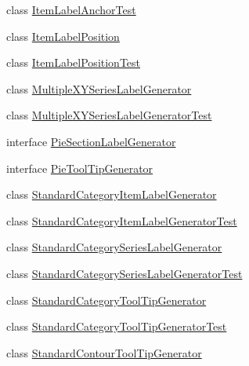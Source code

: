 \begin{DoxyCompactItemize}
class \mbox{\hyperlink{classorg_1_1jfree_1_1chart_1_1labels_1_1_item_label_anchor_test}{Item\+Label\+Anchor\+Test}}
\item 
class \mbox{\hyperlink{classorg_1_1jfree_1_1chart_1_1labels_1_1_item_label_position}{Item\+Label\+Position}}
\item 
class \mbox{\hyperlink{classorg_1_1jfree_1_1chart_1_1labels_1_1_item_label_position_test}{Item\+Label\+Position\+Test}}
\item 
class \mbox{\hyperlink{classorg_1_1jfree_1_1chart_1_1labels_1_1_multiple_x_y_series_label_generator}{Multiple\+X\+Y\+Series\+Label\+Generator}}
\item 
class \mbox{\hyperlink{classorg_1_1jfree_1_1chart_1_1labels_1_1_multiple_x_y_series_label_generator_test}{Multiple\+X\+Y\+Series\+Label\+Generator\+Test}}
\item 
interface \mbox{\hyperlink{interfaceorg_1_1jfree_1_1chart_1_1labels_1_1_pie_section_label_generator}{Pie\+Section\+Label\+Generator}}
\item 
interface \mbox{\hyperlink{interfaceorg_1_1jfree_1_1chart_1_1labels_1_1_pie_tool_tip_generator}{Pie\+Tool\+Tip\+Generator}}
\item 
class \mbox{\hyperlink{classorg_1_1jfree_1_1chart_1_1labels_1_1_standard_category_item_label_generator}{Standard\+Category\+Item\+Label\+Generator}}
\item 
class \mbox{\hyperlink{classorg_1_1jfree_1_1chart_1_1labels_1_1_standard_category_item_label_generator_test}{Standard\+Category\+Item\+Label\+Generator\+Test}}
\item 
class \mbox{\hyperlink{classorg_1_1jfree_1_1chart_1_1labels_1_1_standard_category_series_label_generator}{Standard\+Category\+Series\+Label\+Generator}}
\item 
class \mbox{\hyperlink{classorg_1_1jfree_1_1chart_1_1labels_1_1_standard_category_series_label_generator_test}{Standard\+Category\+Series\+Label\+Generator\+Test}}
\item 
class \mbox{\hyperlink{classorg_1_1jfree_1_1chart_1_1labels_1_1_standard_category_tool_tip_generator}{Standard\+Category\+Tool\+Tip\+Generator}}
\item 
class \mbox{\hyperlink{classorg_1_1jfree_1_1chart_1_1labels_1_1_standard_category_tool_tip_generator_test}{Standard\+Category\+Tool\+Tip\+Generator\+Test}}
\item 
class \mbox{\hyperlink{classorg_1_1jfree_1_1chart_1_1labels_1_1_standard_contour_tool_tip_generator}{Standard\+Contour\+Tool\+Tip\+Generator}}
\item 

\end{DoxyCompactItemize}
